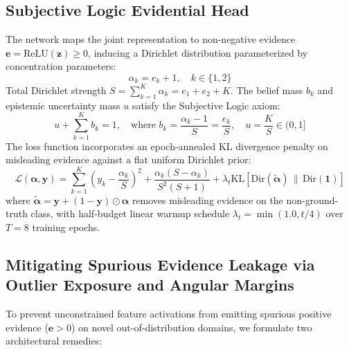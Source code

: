 \documentclass[conference]{IEEEtran}
\begin{document}
\subsection{Subjective Logic Evidential Head}
The network maps the joint representation to non-negative evidence $\mathbf{e} = \text{ReLU}(\mathbf{z}) \ge 0$, inducing a Dirichlet distribution parameterized by concentration parameters:
\begin{equation}
\alpha_k = e_k + 1, \quad k \in \{1, 2\}
\end{equation}
Total Dirichlet strength $S = \sum_{k=1}^K \alpha_k = e_1 + e_2 + K$. The belief mass $b_k$ and epistemic uncertainty mass $u$ satisfy the Subjective Logic axiom:
\begin{equation}
u + \sum_{k=1}^K b_k = 1, \quad \text{where } b_k = \frac{\alpha_k - 1}{S} = \frac{e_k}{S}, \quad u = \frac{K}{S} \in (0, 1]
\end{equation}
The loss function incorporates an epoch-annealed KL divergence penalty on misleading evidence against a flat uniform Dirichlet prior:
\begin{equation}
\mathcal{L}(\boldsymbol{\alpha}, \mathbf{y}) = \sum_{k=1}^K \left(y_k - \frac{\alpha_k}{S}\right)^2 + \frac{\alpha_k (S - \alpha_k)}{S^2 (S + 1)} + \lambda_t \text{KL}\left[\text{Dir}(\tilde{\boldsymbol{\alpha}}) \,\|\, \text{Dir}(\mathbf{1})\right]
\end{equation}
where $\tilde{\boldsymbol{\alpha}} = \mathbf{y} + (1 - \mathbf{y}) \odot \boldsymbol{\alpha}$ removes misleading evidence on the non-ground-truth class, with half-budget linear warmup schedule $\lambda_t = \min(1.0, t / 4)$ over $T=8$ training epochs.

\subsection{Mitigating Spurious Evidence Leakage via Outlier Exposure and Angular Margins}
To prevent unconstrained feature activations from emitting spurious positive evidence ($\mathbf{e} > 0$) on novel out-of-distribution domains, we formulate two architectural remedies:
\end{document}
